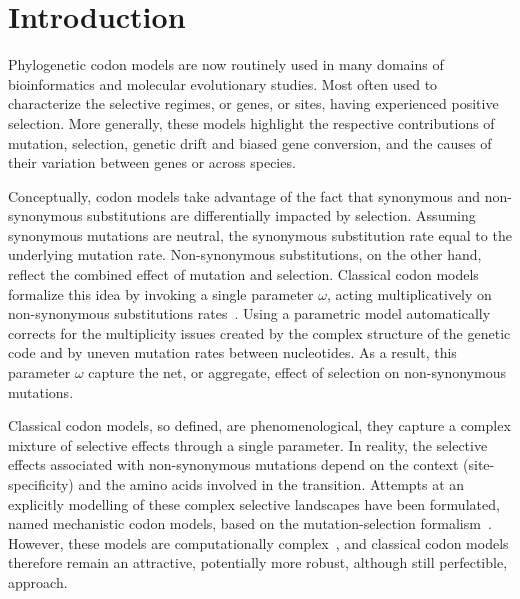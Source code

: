 
\section{Introduction}

Phylogenetic codon models are now routinely used in many domains of bioinformatics and molecular evolutionary studies.
Most often used to characterize the selective regimes, or genes, or sites, having experienced positive selection.
More generally, these models highlight the respective contributions of mutation, selection, genetic drift and biased gene conversion, and the causes of their variation between genes or across species.

Conceptually, codon models take advantage of the fact that synonymous and non-synonymous substitutions are differentially impacted by selection.
Assuming synonymous mutations are neutral, the synonymous substitution rate equal to the underlying mutation rate.
Non-synonymous substitutions, on the other hand, reflect the combined effect of mutation and selection.
Classical codon models formalize this idea by invoking a single parameter $\omega$, acting multiplicatively on non-synonymous substitutions rates~\citep{Muse1994, Goldman1994}.
Using a parametric model automatically corrects for the multiplicity issues created by the complex structure of the genetic code and by uneven mutation rates between nucleotides.
As a result, this parameter $\omega$ capture the net, or aggregate, effect of selection on non-synonymous mutations.

Classical codon models, so defined, are phenomenological, they capture a complex mixture of selective effects through a single parameter.
In reality, the selective effects associated with non-synonymous mutations depend on the context (site-specificity) and the amino acids involved in the transition.
Attempts at an explicitly modelling of these complex selective landscapes have been formulated, named mechanistic codon models, based on the mutation-selection formalism~\citep{Halpern1998}.
However, these models are computationally complex~\citep{Rodrigue2010, Tamuri2012}, and classical codon models therefore remain an attractive, potentially more robust, although still perfectible, approach.

